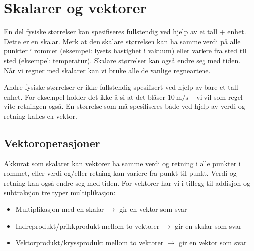 \chapter{Skalarer og vektorer}
En del fysiske størrelser kan spesifiseres fullstendig ved hjelp av et tall + enhet. Dette er en skalar. Merk at den skalare størrelsen kan ha samme verdi på alle punkter i rommet (eksempel: lysets hastighet i vakuum) eller variere fra sted til sted (eksempel: temperatur). Skalare størrelser kan også endre seg med tiden. Når vi regner med skalarer kan vi bruke alle de vanlige regneartene.

Andre fysiske størrelser er ikke fullstendig spesifisert ved hjelp av bare et tall + enhet. For eksempel holder det ikke å si at det blåser $10~\mathrm{m/s}$ -- vi vil som regel vite retningen også. En størrelse som må spesifiseres både ved hjelp av verdi og retning kalles en vektor. 


\section{Vektoroperasjoner}
Akkurat som skalarer kan vektorer ha samme verdi og retning i alle punkter i rommet, eller verdi og/eller retning kan variere fra punkt til punkt. Verdi og retning kan også endre seg med tiden. For vektorer har vi i tillegg til addisjon og subtraksjon tre typer multiplikasjon:
\begin{itemize}
\item Multiplikasjon med en skalar $\to$ gir en vektor som svar
\item Indreprodukt/prikkprodukt mellom to vektorer $\to$ gir en skalar som svar
\item Vektorprodukt/kryssprodukt mellom to vektorer $\to$ gir en vektor som svar
\end{itemize}

